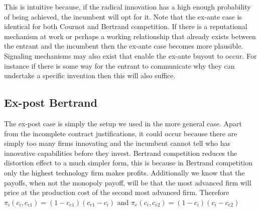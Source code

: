 \documentclass[11pt]{article}
\begin{document}
This is intuitive because, if the radical innovation has a high enough probability of being achieved, the incumbent will opt for it. Note that the ex-ante case is identical for both Cournot and Bertrand competition. If there is a reputational mechanism at work or perhaps a working relationship that already exists between the entrant and the incumbent then the ex-ante case becomes more plausible. Signaling mechanisms may also exist that enable the ex-ante buyout to occur. For instance if there is some way for the entrant to communicate why they can undertake a specific invention then this will also suffice.

\subsection{Ex-post Bertrand}
The ex-post case is simply the setup we used in the more general case. Apart from the incomplete contract justifications, it could occur because there are simply too many firms innovating and the incumbent cannot tell who has innovative capabilities before they invest. Bertrand competition reduces the distortion effect to a much simpler form, this is because in Bertrand competition only the highest technology firm makes profits. Additionally we know that the payoffs, when not the monopoly payoff, will be that the most advanced firm will price at the production cost of the second most advanced firm. Therefore $\pi_i(c_i,c_{e1})= (1-c_{e1})(c_{e1}-c_i)$ and $\pi_e(c_i,c_{e2})= (1-c_{i})(c_{i}-c_{e2})$

 
\end{document}

